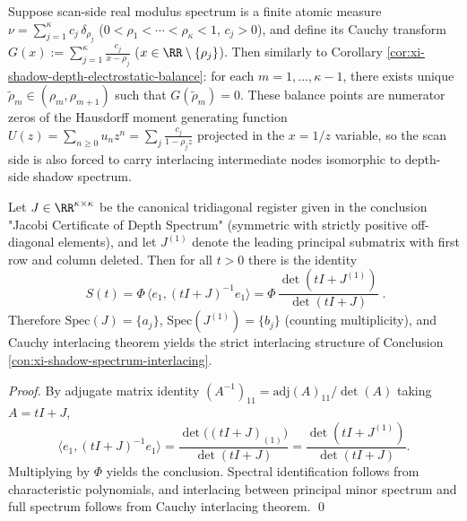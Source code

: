 \begin{remark}\label{rem:xi-scan-shadow-radius-cauchy-balance}
Suppose scan-side real modulus spectrum is a finite atomic measure \(\nu=\sum_{j=1}^{\kappa}c_j\,\delta_{\rho_j}\) (\(0<\rho_1<\cdots<\rho_\kappa<1\), \(c_j>0\)), and define its Cauchy transform
\(
G(x):=\sum_{j=1}^{\kappa}\frac{c_j}{x-\rho_j}
\) (\(x\in\RR\setminus\{\rho_j\}\)).
Then similarly to Corollary \ref{cor:xi-shadow-depth-electrostatic-balance}: for each \(m=1,\dots,\kappa-1\), there exists unique \(\widetilde\rho_m\in(\rho_m,\rho_{m+1})\) such that \(G(\widetilde\rho_m)=0\).
These balance points are numerator zeros of the Hausdorff moment generating function \(U(z)=\sum_{n\ge0}u_n z^n=\sum_j\frac{c_j}{1-\rho_j z}\) projected in the \(x=1/z\) variable, so the scan side is also forced to carry interlacing intermediate nodes isomorphic to depth-side shadow spectrum.
\end{remark}

\begin{proposition}\label{con:xi-shadow-spectrum-determinant-ratio}
Let \(J\in\RR^{\kappa\times\kappa}\) be the canonical tridiagonal register given in the conclusion "Jacobi Certificate of Depth Spectrum" (symmetric with strictly positive off-diagonal elements), and let \(J^{(1)}\) denote the leading principal submatrix with first row and column deleted.
Then for all \(t>0\) there is the identity
\[
\boxed{\;
S(t)=\Phi\,\langle e_1,(tI+J)^{-1}e_1\rangle
=\Phi\,\frac{\det(tI+J^{(1)})}{\det(tI+J)}\; }.
\]
Therefore \( \mathrm{Spec}(J)=\{a_j\}\), \(\mathrm{Spec}(J^{(1)})=\{b_j\}\) (counting multiplicity), and Cauchy interlacing theorem yields the strict interlacing structure of Conclusion \ref{con:xi-shadow-spectrum-interlacing}.
\end{proposition}
\begin{proof}
By adjugate matrix identity \((A^{-1})_{11}=\mathrm{adj}(A)_{11}/\det(A)\) taking \(A=tI+J\),
\[
\langle e_1,(tI+J)^{-1}e_1\rangle
=\frac{\det\bigl((tI+J)_{(1)}\bigr)}{\det(tI+J)}
=\frac{\det(tI+J^{(1)})}{\det(tI+J)}.
\]
Multiplying by \(\Phi\) yields the conclusion. Spectral identification follows from characteristic polynomials, and interlacing between principal minor spectrum and full spectrum follows from Cauchy interlacing theorem. \qed
\end{proof}

